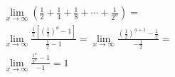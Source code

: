 \begin{ex}
\begin{align}
&\lim_{x\rightarrow \infty} \left(\frac{1}{2}+\frac{1}{4}+\frac{1}{8}+\cdots+\frac{1}{2^u}\right)=\nonumber \\
&\lim_{x\rightarrow \infty} \frac{\frac{1}{2}\left[\left(\frac{1}{2}\right)^u-1\right]}{\frac{1}{2}-1}=
\lim_{x\rightarrow \infty} \frac{\left(\frac{1}{2}\right)^{u+1}-\frac{1}{2}}{-\frac{1}{2}}=\nonumber\\
&\lim_{x\rightarrow \infty} \frac{\frac{1^u}{2^u}-1}{-1}=1 \nonumber
\end{align}
\end{ex}